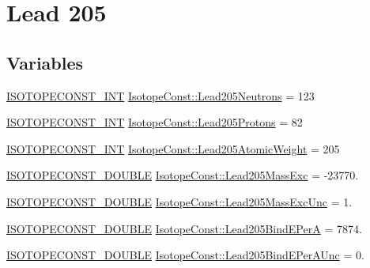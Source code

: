 \hypertarget{group___isotope_const-_lead-_pb205}{}\section{Lead 205}
\label{group___isotope_const-_lead-_pb205}
\subsection*{Variables}
\begin{DoxyCompactItemize}
\item 
\mbox{\hyperlink{group___isotope_const-_macros_ga5f18360b3e99483a35c32d789e62621c}{I\+S\+O\+T\+O\+P\+E\+C\+O\+N\+S\+T\+\_\+\+I\+NT}} \mbox{\hyperlink{group___isotope_const-_lead-_pb205_ga2bd4facd0e7f5d7599adb8112dec66d5}{Isotope\+Const\+::\+Lead205\+Neutrons}} = 123
\item 
\mbox{\hyperlink{group___isotope_const-_macros_ga5f18360b3e99483a35c32d789e62621c}{I\+S\+O\+T\+O\+P\+E\+C\+O\+N\+S\+T\+\_\+\+I\+NT}} \mbox{\hyperlink{group___isotope_const-_lead-_pb205_ga06fb81afae2e3bfcdff5534315df15ac}{Isotope\+Const\+::\+Lead205\+Protons}} = 82
\item 
\mbox{\hyperlink{group___isotope_const-_macros_ga5f18360b3e99483a35c32d789e62621c}{I\+S\+O\+T\+O\+P\+E\+C\+O\+N\+S\+T\+\_\+\+I\+NT}} \mbox{\hyperlink{group___isotope_const-_lead-_pb205_ga98f1d4f54ef198f49d8a35fec84fb336}{Isotope\+Const\+::\+Lead205\+Atomic\+Weight}} = 205
\item 
\mbox{\hyperlink{group___isotope_const-_macros_ga8f45a7272ce02c0b4c65c44636ed719a}{I\+S\+O\+T\+O\+P\+E\+C\+O\+N\+S\+T\+\_\+\+D\+O\+U\+B\+LE}} \mbox{\hyperlink{group___isotope_const-_lead-_pb205_ga4503a9b22a6f4d349a4c3b1240a427e1}{Isotope\+Const\+::\+Lead205\+Mass\+Exc}} = -\/23770.
\item 
\mbox{\hyperlink{group___isotope_const-_macros_ga8f45a7272ce02c0b4c65c44636ed719a}{I\+S\+O\+T\+O\+P\+E\+C\+O\+N\+S\+T\+\_\+\+D\+O\+U\+B\+LE}} \mbox{\hyperlink{group___isotope_const-_lead-_pb205_gad68781d2962cfd921611a23c75957a4b}{Isotope\+Const\+::\+Lead205\+Mass\+Exc\+Unc}} = 1.
\item 
\mbox{\hyperlink{group___isotope_const-_macros_ga8f45a7272ce02c0b4c65c44636ed719a}{I\+S\+O\+T\+O\+P\+E\+C\+O\+N\+S\+T\+\_\+\+D\+O\+U\+B\+LE}} \mbox{\hyperlink{group___isotope_const-_lead-_pb205_ga2eb5e7edfab388ef4a3b675b405cca5b}{Isotope\+Const\+::\+Lead205\+Bind\+E\+PerA}} = 7874.
\item 
\mbox{\hyperlink{group___isotope_const-_macros_ga8f45a7272ce02c0b4c65c44636ed719a}{I\+S\+O\+T\+O\+P\+E\+C\+O\+N\+S\+T\+\_\+\+D\+O\+U\+B\+LE}} \mbox{\hyperlink{group___isotope_const-_lead-_pb205_ga0b8cdb74cdd2b3d8f9e1835adcd42325}{Isotope\+Const\+::\+Lead205\+Bind\+E\+Per\+A\+Unc}} = 0.

\end{DoxyCompactItemize}
